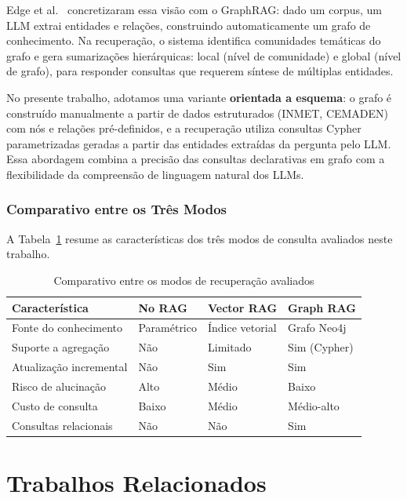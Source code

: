 \documentclass[conference]{IEEEtran}
\begin{document}
Edge et al.~\cite{edge2024graphrag} concretizaram essa visão
com o GraphRAG: dado um corpus, um LLM extrai entidades e
relações, construindo automaticamente um grafo de conhecimento.
Na recuperação, o sistema identifica comunidades temáticas do
grafo e gera sumarizações hierárquicas: local (nível de
comunidade) e global (nível de grafo), para responder
consultas que requerem síntese de múltiplas entidades.

No presente trabalho, adotamos uma variante \textbf{orientada
a esquema}: o grafo é construído manualmente a partir de dados
estruturados (INMET, CEMADEN) com nós e relações pré-definidos,
e a recuperação utiliza consultas Cypher parametrizadas geradas
a partir das entidades extraídas da pergunta pelo LLM.
Essa abordagem combina a precisão das consultas declarativas
em grafo com a flexibilidade da compreensão de linguagem
natural dos LLMs.

\subsubsection{Comparativo entre os Três Modos}

A Tabela~\ref{tab:comparativo} resume as características dos
três modos de consulta avaliados neste trabalho.

\begin{table}[htbp]
\caption{Comparativo entre os modos de recuperação avaliados}
\label{tab:comparativo}
\begin{center}
\begin{tabular}{p{1.8cm}p{1.8cm}p{1.8cm}p{1.8cm}}
\toprule
\textbf{Característica} & \textbf{No RAG} & \textbf{Vector RAG} & \textbf{Graph RAG} \\
\midrule
Fonte do conhecimento & Paramétrico & Índice vetorial & Grafo Neo4j \\
Suporte a agregação & Não & Limitado & Sim (Cypher) \\
Atualização incremental & Não & Sim & Sim \\
Risco de alucinação & Alto & Médio & Baixo \\
Custo de consulta & Baixo & Médio & Médio-alto \\
Consultas relacionais & Não & Não & Sim \\
\bottomrule
\end{tabular}
\end{center}
\end{table}

\section{Trabalhos Relacionados}
\label{sec:relacionados}
\end{document}
